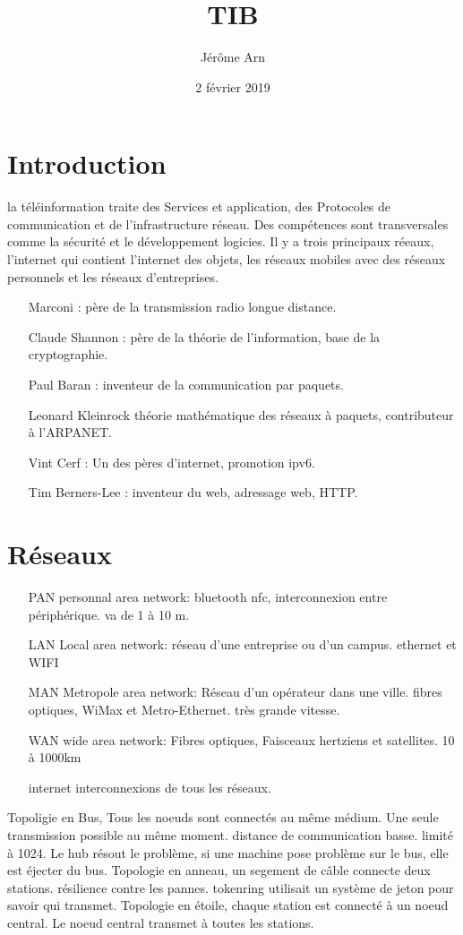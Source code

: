 \documentclass{article}
\title{TIB}
\author{Jérôme Arn}
\date{2 février 2019}
\begin{document}
\section{Introduction}
la téléinformation traite des Services et application, des Protocoles de communication et de l'infrastructure réseau. Des compétences sont transversales comme la sécurité et le développement logicies. Il y a trois principaux réeaux, l'internet qui contient l'internet des objets, les réseaux mobiles avec des réseaux personnels et les réseaux d'entreprises. 
\begin{itemize}
	\item[Marconi :] père de la transmission radio longue distance.
	\item[Claude Shannon :] père de la théorie de l'information, base de la cryptographie. 
	\item[Paul Baran :]inventeur de la communication par paquets.
	\item[Leonard Kleinrock] théorie mathématique des réseaux à paquets, contributeur à l'ARPANET.
	\item[Vint Cerf :]Un des pères d'internet, promotion ipv6.
	\item[Tim Berners-Lee :]inventeur du web, adressage web, HTTP.
\end{itemize}

\section{Réseaux}
\bigskip
\begin{itemize}
	\item[PAN personnal area network:] bluetooth nfc, interconnexion entre périphérique. va de 1 à 10 m.
	\item[LAN Local area network:] réseau d'une entreprise ou d'un campus. ethernet et WIFI
	\item[MAN Metropole area network:]Réseau d'un opérateur dans une ville. fibres optiques, WiMax et Metro-Ethernet. très grande vitesse.  
	\item[WAN wide area network:]Fibres optiques, Faisceaux hertziens et satellites. 10 à 1000km
	\item[internet] interconnexions de tous les réseaux. 
\end{itemize}
\bigskip
Topoligie en Bus, Tous les noeuds sont connectés au même médium. Une seule transmission possible au même moment. distance de communication basse. limité à 1024. Le hub résout le problème, si une machine pose problème sur le bus, elle est éjecter du bus. 
Topologie en anneau, un segement de câble connecte deux stations. résilience contre les pannes. tokenring utilisait un système de jeton pour savoir qui transmet. 
Topologie en étoile, chaque station est connecté à un noeud central. Le noeud central transmet à toutes les stations. 
\end{document}
